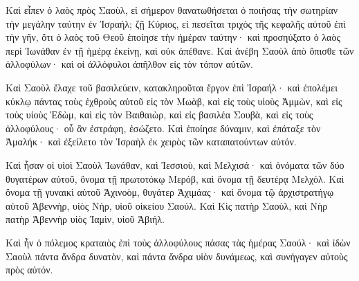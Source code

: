 {Καὶ εἶπεν ὁ λαὸς πρὸς Σαοὺλ, εἰ σήμερον θανατωθήσεται ὁ ποιήσας τὴν σωτηρίαν τὴν μεγάλην ταύτην ἐν Ἰσραήλ; ζῇ Κύριος, εἰ πεσεῖται τριχὸς τῆς κεφαλῆς αὐτοῦ ἐπὶ τὴν γῆν, ὅτι ὁ λαὸς τοῦ Θεοῦ ἐποίησε τὴν ἡμέραν ταύτην· καὶ προσηύξατο ὁ λαὸς περὶ Ἰωνάθαν ἐν τῇ ἡμέρᾳ ἐκείνῃ, καὶ οὐκ ἀπέθανε.
Καὶ ἀνέβη Σαοὺλ ἀπὸ ὄπισθε τῶν ἀλλοφύλων· καὶ οἱ ἀλλόφυλοι ἀπῆλθον εἰς τὸν τόπον αὐτῶν.
\par }{\PP {}Καὶ Σαοὺλ ἔλαχε τοῦ βασιλεύειν, κατακληροῦται ἔργον ἐπὶ Ἰσραήλ· καὶ ἐπολέμει κύκλῳ πάντας τοὺς ἐχθροὺς αὐτοῦ εἰς τὸν Μωὰβ, καὶ εἰς τοὺς υἱοὺς Ἀμμὼν, καὶ εἰς τοὺς υἱοὺς Ἐδὼμ, καὶ εἰς τὸν Βαιθαιὼρ, καὶ εἰς βασιλέα Σουβὰ, καὶ εἰς τοὺς ἀλλοφύλους· οὗ ἂν ἐστράφη, ἐσώζετο.
Καὶ ἐποίησε δύναμιν, καὶ ἐπάταξε τὸν Ἀμαλήκ· καὶ ἐξείλετο τὸν Ἰσραὴλ ἐκ χειρὸς τῶν καταπατούντων αὐτόν.
\par }{\PP {}Καὶ ἦσαν οἱ υἱοὶ Σαοὺλ Ἰωνάθαν, καὶ Ἰεσσιοὺ, καὶ Μελχισά· καὶ ὀνόματα τῶν δύο θυγατέρων αὐτοῦ, ὄνομα τῇ πρωτοτόκῳ Μερόβ, καὶ ὄνομα τῇ δευτέρᾳ Μελχόλ.
Καὶ ὄνομα τῇ γυναικὶ αὐτοῦ Ἀχινοὸμ, θυγάτερ Ἀχιμάας· καὶ ὄνομα τῷ ἀρχιστρατήγῳ αὐτοῦ Ἀβεννὴρ, υἱὸς Νὴρ, υἱοῦ οἰκείου Σαούλ.
Καὶ Κὶς πατὴρ Σαοὺλ, καὶ Νὴρ πατὴρ Ἀβεννὴρ υἱὸς Ἰαμὶν, υἱοῦ Ἀβιήλ.
\par }{\PP {}Καὶ ἦν ὁ πόλεμος κραταιὸς ἐπὶ τοὺς ἀλλοφύλους πάσας τὰς ἡμέρας Σαούλ· καὶ ἰδὼν Σαοὺλ πάντα ἄνδρα δυνατὸν, καὶ πάντα ἄνδρα υἱὸν δυνάμεως, καὶ συνήγαγεν αὐτοὺς πρὸς αὑτόν.

}

